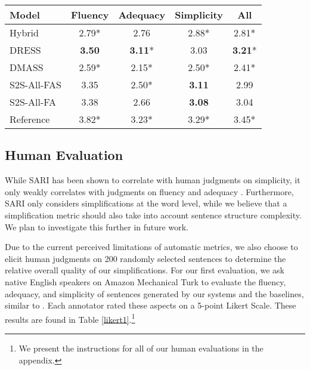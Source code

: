 \documentclass[11pt,a4paper]{article}
\begin{document}
\begin{table*}
\begin{center}
\begin{tabular}{|l|cccc|}
\hline
\textbf{Model} & \textbf{Fluency} & \textbf{Adequacy} & \textbf{Simplicity} & \textbf{All} \\ \hline
Hybrid & 2.79* & 2.76 & 2.88* & 2.81* \\
DRESS & \textbf{3.50} & \textbf{3.11}* & 3.03 & \textbf{3.21}* \\ 
DMASS & 2.59* & 2.15* & 2.50* & 2.41* \\ \hline
S2S-All-FAS & 3.35 & 2.50* & \textbf{3.11} & 2.99 \\
S2S-All-FA & 3.38 & 2.66 & \textbf{3.08} & 3.04 \\ \hline
Reference & 3.82* & 3.23* & 3.29* & 3.45* \\ \hline
\end{tabular}
\end{center}
\caption{\label{likert1} Average ratings of crowdsourced human judgments on fluency, adequacy and complexity. Ratings significantly different from S2S-All-FA are marked with * (); statistical significance tests were calculated using a student t-test. We provide 95\% confidence intervals for each rating in the appendix.}
\end{table*}

\subsection{Human Evaluation}

While SARI has been shown to correlate with human judgments on simplicity, it only weakly correlates with judgments on fluency and adequacy \cite{xu2016optimizing}. Furthermore, SARI only considers simplifications at the word level, while we believe that a simplification metric should also take into account sentence structure complexity. We plan to investigate this further in future work.

Due to the current perceived limitations of automatic metrics, we also choose to elicit human judgments on 200 randomly selected sentences to determine the relative overall quality of our simplifications. For our first evaluation, we ask native English speakers on Amazon Mechanical Turk to evaluate the fluency, adequacy, and simplicity of sentences generated by our systems and the baselines, similar to . Each annotator rated these aspects on a 5-point Likert Scale. These results are found in Table \ref{likert1}.\footnote{We present the instructions for all of our human evaluations in the appendix.}
\end{document}
